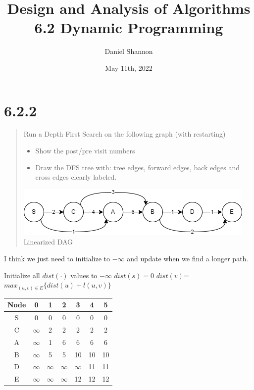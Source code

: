 \documentclass[12pt, letterpaper, twoside]{article}
\title{%
Design and Analysis of Algorithms\\
\large 6.2 Dynamic Programming
}
\author{Daniel Shannon}
\date{May 11th, 2022}
\begin{document}
\begin{titlepage}
\maketitle
\end{titlepage}
\section*{6.2.2}
\begin{quote}
  Run a Depth First Search on the following graph (with restarting)
  \begin{itemize}
    \item Show the post/pre visit numbers
    \item Draw the DFS tree with: tree edges, forward edges, back edges and cross edges clearly labeled.
  \end{itemize}
  \begin{center}
    \includegraphics[scale=.6]{6_2_2_linearized_dag.png}
    \\Linearized DAG
  \end{center}
\end{quote}

I think we just need to initialize to $-\infty$ and update when we find a longer path.

\begin{algorithmic}
\State Initialize all $dist(\cdot)$ values to $-\infty$
\State $dist(s)=0$
\State $dist(v)$=$max_{(u,v)\in{E}}\{dist(u)+l(u,v)\}$
\EndFor
\end{algorithmic}

\begin{center}
  \begin{tabular}{||c c c c c c c||}
    \hline
    Node & 0 & 1 & 2 & 3 & 4 & 5\\
    \hline\hline
    S & 0 & 0 & 0 & 0 & 0 & 0\\
    \hline
    C & $\infty$ & 2 & 2 & 2 & 2 & 2\\
    \hline
    A & $\infty$ & 1 & 6 & 6 & 6 & 6\\
    \hline
    B & $\infty$ & 5 & 5 & 10 & 10 & 10\\
    \hline
    D & $\infty$ & $\infty$ & $\infty$ & $\infty$ & 11 & 11\\
    \hline
    E & $\infty$ & $\infty$ & $\infty$ & 12 & 12 & 12\\
    \hline
  \end{tabular}
\end{center}
\end{document}
